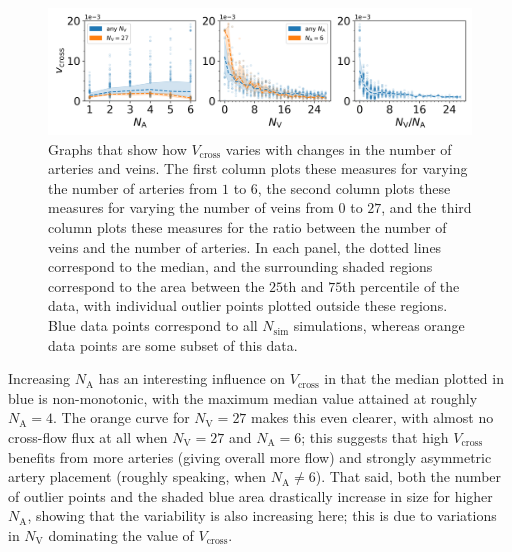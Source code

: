             \begin{figure}
                \centering
                \includegraphics[width=\textwidth]{diagrams/results-variations/mega4_no-arteries_no-veins_veins-to-arteries.png}
                \caption{Graphs that show how $V_\text{cross}$ varies with changes in the number of arteries and veins. The first column plots these measures for varying the number of arteries from $1$ to $6$, the second column plots these measures for varying the number of veins from $0$ to $27$, and the third column plots these measures for the ratio between the number of veins and the number of arteries. In each panel, the dotted lines correspond to the median, and the surrounding shaded regions correspond to the area between the $25$th and $75$th percentile of the data, with individual outlier points plotted outside these regions. Blue data points correspond to all $N_\text{sim}$ simulations, whereas orange data points are some subset of this data.}
                \label{fig:mega-vessels4}
            \end{figure}
            
            Increasing $N_\text{A}$ has an interesting influence on $V_\text{cross}$ in that the median plotted in blue is non-monotonic, with the maximum median value attained at roughly $N_\text{A} = 4$. The orange curve for $N_\text{V} = 27$ makes this even clearer, with almost no cross-flow flux at all when $N_\text{V} = 27$ and $N_\text{A} = 6$; this suggests that high $V_\text{cross}$ benefits from more arteries (giving overall more flow) and strongly asymmetric artery placement (roughly speaking, when $N_\text{A} \neq 6$). That said, both the number of outlier points and the shaded blue area drastically increase in size for higher $N_\text{A}$, showing that the variability is also increasing here; this is due to variations in $N_\text{V}$ dominating the value of $V_\text{cross}$.
            
